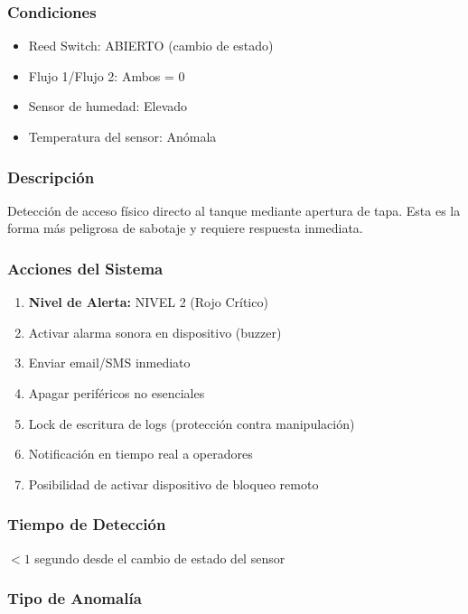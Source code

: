 \documentclass[12pt,a4paper,oneside]{report}
\begin{document}
\subsubsection{Condiciones}

\begin{itemize}
    \item Reed Switch: ABIERTO (cambio de estado)
    \item Flujo 1/Flujo 2: Ambos = 0
    \item Sensor de humedad: Elevado
    \item Temperatura del sensor: Anómala
\end{itemize}

\subsubsection{Descripción}

Detección de acceso físico directo al tanque mediante apertura de tapa. Esta es la forma más peligrosa de sabotaje y requiere respuesta inmediata.

\subsubsection{Acciones del Sistema}

\begin{enumerate}
    \item \textbf{Nivel de Alerta:} NIVEL 2 (Rojo Crítico)
    \item Activar alarma sonora en dispositivo (buzzer)
    \item Enviar email/SMS inmediato
    \item Apagar periféricos no esenciales
    \item Lock de escritura de logs (protección contra manipulación)
    \item Notificación en tiempo real a operadores
    \item Posibilidad de activar dispositivo de bloqueo remoto
\end{enumerate}

\subsubsection{Tiempo de Detección}

$< 1$ segundo desde el cambio de estado del sensor

\subsubsection{Tipo de Anomalía}
\end{document}
